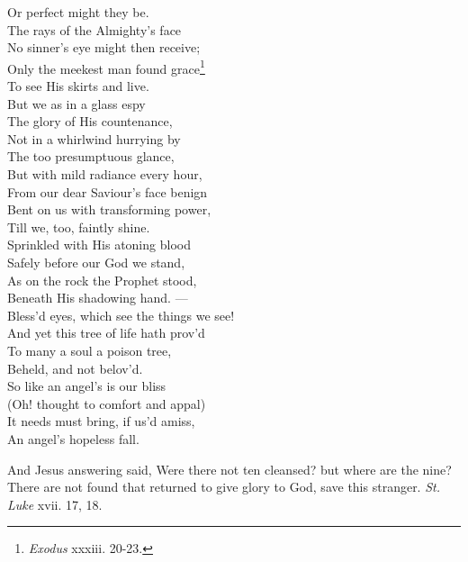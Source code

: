  Or perfect might they be. \\
  The rays of the Almighty’s face \\
 No sinner’s eye might then receive; \\
 Only the meekest man found grace\footnote{\emph{Exodus} xxxiii. 20-23.} \\
 To see His skirts and live. \\
  But we as in a glass espy \\
 The glory of His countenance, \\
 Not in a whirlwind hurrying by \\
 The too presumptuous glance, \\
  But with mild radiance every hour, \\
 From our dear Saviour’s face benign \\
 Bent on us with transforming power, \\
 Till we, too, faintly shine. \\
  Sprinkled with His atoning blood \\
 Safely before our God we stand, \\
 As on the rock the Prophet stood, \\
 Beneath His shadowing hand. — \\
  Bless’d eyes, which see the things we see! \\
 And yet this tree of life hath prov’d \\
 To many a soul a poison tree, \\
 Beheld, and not belov’d. \\
  So like an angel’s is our bliss \\
 (Oh! thought to comfort and appal) \\
 It needs must bring, if us’d amiss, \\
 An angel’s hopeless fall.\\


And Jesus answering said, Were there not ten cleansed? but where are the nine? There are not found that returned to give glory to God, save this stranger. \emph{St. Luke} xvii. 17, 18.

